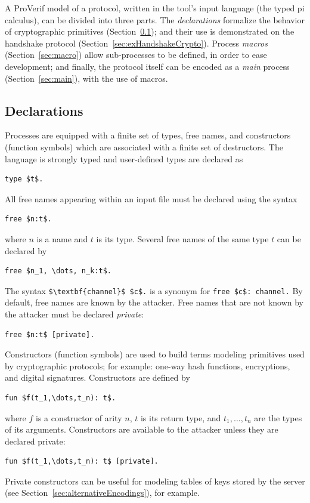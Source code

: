 \documentclass{book}
\begin{document}
A ProVerif model of a protocol, written in the tool's input language (the typed pi calculus), can be divided into three parts. The \emph{declarations} formalize the behavior of cryptographic primitives (Section~\ref{sec:topMatter}); and their use is demonstrated on the handshake protocol (Section~\ref{sec:exHandshakeCrypto}). Process \emph{macros} (Section~\ref{sec:macro}) allow sub-processes to be defined, in order to ease development; and finally, the protocol itself can be encoded as a \emph{main} process (Section~\ref{sec:main}), with the use of macros.%

\subsection{Declarations}\label{sec:topMatter}

Processes are equipped with a finite set of types, free names, and constructors (function symbols) which are associated with a finite set of destructors. The language is strongly typed and user-defined types are declared as
\begin{lstlisting}[numbers=none]
	type $t$.
\end{lstlisting}
All free names appearing within an input file must be declared using the syntax
\begin{lstlisting}[numbers=none]
	free $n:t$.
\end{lstlisting}
where $n$ is a name and $t$ is its type.
Several free names of the same type $t$ can be declared by
\begin{lstlisting}[numbers=none]
	free $n_1, \dots, n_k:t$.
\end{lstlisting}
The syntax \lstinline!$\textbf{channel}$ $c$.! is a synonym for \lstinline!free $c$: channel.! By default, free names are known by the attacker. Free names that are not known by the attacker must be declared \emph{private}:
\begin{lstlisting}[numbers=none]
	free $n:t$ [private].
\end{lstlisting}
Constructors (function symbols) are used to build terms modeling primitives used by cryptographic protocols; for example: one-way hash functions, encryptions, and digital signatures. Constructors are defined by
\begin{lstlisting}[numbers=none]
	fun $f(t_1,\dots,t_n): t$.
\end{lstlisting}
where $f$ is a constructor of arity $n$, $t$ is its return type, and $t_1,\dots,t_n$ are the types of its arguments. Constructors are available to the attacker unless they are declared private:
\begin{lstlisting}[numbers=none]
	fun $f(t_1,\dots,t_n): t$ [private].
\end{lstlisting}
Private constructors can be useful for modeling tables of keys stored by the server (see Section~\ref{sec:alternativeEncodings}), for example.
\end{document}
